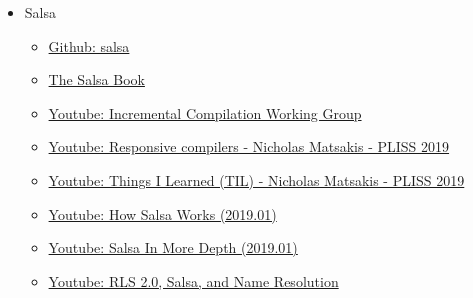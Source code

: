 \documentclass[12pt, a4paper]{report}
\begin{document}
\begin{itemize}[noitemsep]
\item Salsa
  \begin{itemize}[noitemsep]
  \item \href{https://github.com/salsa-rs/salsa/}{Github: salsa}
  \item \href{https://salsa-rs.github.io/salsa/}{\Square The Salsa Book}
  \item \href{https://www.youtube.com/playlist?list=PL85XCvVPmGQh0P_VEPVM2ZIlBwl4MQMNY}{\Square Youtube: Incremental Compilation Working Group}
  \item \href{https://www.youtube.com/watch?v=N6b44kMS6OM}{\Square Youtube: Responsive compilers - Nicholas Matsakis - PLISS 2019}
  \item \href{https://www.youtube.com/watch?v=LIYkT3p5gTs}{\CheckedBox Youtube: Things I Learned (TIL) - Nicholas Matsakis - PLISS 2019}
  \item \href{https://www.youtube.com/watch?v=_muY4HjSqVw}{\Square Youtube: How Salsa Works (2019.01)}
  \item \href{https://www.youtube.com/watch?v=i_IhACacPRY}{\Square Youtube: Salsa In More Depth (2019.01)}
  \item \href{https://www.youtube.com/watch?v=Xr-rBqLr-G4}{\Square Youtube: RLS 2.0, Salsa, and Name Resolution}
  \end{itemize}


\end{itemize}
\end{document}
